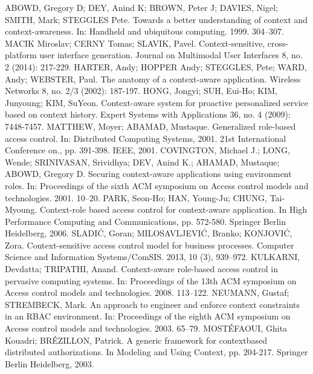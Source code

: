 \documentclass{poster15}
\begin{document}
\begin{thebibliography}{9}
ABOWD, Gregory D; DEY, Anind K; BROWN, Peter J; DAVIES, Nigel; SMITH, Mark; STEGGLES Pete. Towards a better understanding of context and context-awareness. In: Handheld and ubiquitous computing. 1999. 304–307.
MACIK Miroslav; CERNY Tomas; SLAVIK, Pavel. Context-sensitive, cross-platform user interface generation. Journal on Multimodal User Interfaces 8, no. 2 (2014): 217-229.
HARTER, Andy; HOPPER Andy; STEGGLES, Pete; WARD, Andy; WEBSTER, Paul. The anatomy of a context-aware application. Wireless Networks 8, no. 2/3 (2002): 187-197.
HONG, Jongyi; SUH, Eui-Ho; KIM, Junyoung; KIM, SuYeon. Context-aware system for proactive personalized service based on context history. Expert Systems with Applications 36, no. 4 (2009): 7448-7457.
MATTHEW, Moyer; ABAMAD, Mustaque. Generalized role-based access control. In: Distributed Computing Systems, 2001. 21st International Conference on., pp. 391-398. IEEE, 2001.
COVINGTON, Michael J.; LONG, Wende; SRINIVASAN, Srividhya; DEV, Anind K.; AHAMAD, Mustaque; ABOWD, Gregory D. Securing context-aware applications using environment roles. In: Proceedings of the sixth ACM symposium on Access control models and technologies. 2001. 10–20.
PARK, Seon-Ho; HAN, Young-Ju; CHUNG, Tai-Myoung. Context-role based access control for context-aware application. In High Performance Computing and Communications, pp. 572-580. Springer Berlin Heidelberg, 2006.
SLADI\'C, Goran; MILOSAVLJEVI\'C, Branko; KONJOVI\'C, Zora. Context-sensitive access control model for business processes. Computer Science and Information Systems/ComSIS. 2013, 10 (3), 939–972.
KULKARNI, Devdatta; TRIPATHI, Anand. Context-aware role-based access control in pervasive computing systems. In: Proceedings of the 13th ACM symposium on Access control models and technologies. 2008. 113–122.
NEUMANN, Gustaf; STREMBECK, Mark. An approach to engineer and enforce context constraints in an RBAC environment. In: Proceedings of the eighth ACM symposium on Access control models and technologies. 2003. 65–79.
MOST\'EFAOUI, Ghita Kouadri; BR\'EZILLON, Patrick. A generic framework for contextbased distributed authorizations. In Modeling and Using Context, pp. 204-217. Springer Berlin Heidelberg, 2003.

\end{thebibliography}
\end{document}
